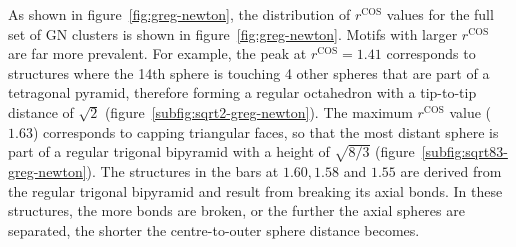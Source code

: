 As shown in figure~\ref{fig:greg-newton}, the distribution of $r^\text{COS}$
values for the full set of \ac{GN} clusters is shown in
figure~\ref{fig:greg-newton}.  Motifs with larger $r^\text{COS}$ are far more
prevalent.  For example, the peak at $r^\text{COS} = 1.41$ corresponds to
structures where the 14th sphere is touching 4 other spheres that are part of a
tetragonal pyramid, therefore forming a regular octahedron with a tip-to-tip
distance of $\sqrt{2}$ (figure~\ref{subfig:sqrt2-greg-newton}).  The maximum
$r^\text{COS}$ value ($1.63$) corresponds to capping triangular faces, so that
the most distant sphere is part of a regular trigonal bipyramid with a height
of $\sqrt{8/3}$ (figure~\ref{subfig:sqrt83-greg-newton}).  The structures in the
bars at $1.60,1.58$ and $1.55$ are derived from the regular trigonal bipyramid
and result from breaking its axial bonds.  In these structures, the more bonds
are broken, or the further the axial spheres are separated, the shorter the
centre-to-outer sphere distance becomes.
